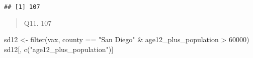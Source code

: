 \documentclass[
]{article}
\newenvironment{Shaded}{\begin{snugshade}}{\end{snugshade}}
\newcommand{\DecValTok}[1]{\textcolor[rgb]{0.00,0.00,0.81}{#1}}
\newcommand{\FunctionTok}[1]{\textcolor[rgb]{0.00,0.00,0.00}{#1}}
\newcommand{\NormalTok}[1]{#1}
\newcommand{\OtherTok}[1]{\textcolor[rgb]{0.56,0.35,0.01}{#1}}
\newcommand{\SpecialCharTok}[1]{\textcolor[rgb]{0.00,0.00,0.00}{#1}}
\newcommand{\StringTok}[1]{\textcolor[rgb]{0.31,0.60,0.02}{#1}}
\begin{document}
\begin{verbatim}
## [1] 107
\end{verbatim}

\begin{quote}
Q11. 107
\end{quote}

\begin{Shaded}
\begin{Highlighting}[]
\NormalTok{sd12 }\OtherTok{\textless{}{-}} \FunctionTok{filter}\NormalTok{(vax, county }\SpecialCharTok{==} \StringTok{"San Diego"} \SpecialCharTok{\&}\NormalTok{ age12\_plus\_population }\SpecialCharTok{\textgreater{}} \DecValTok{60000}\NormalTok{)}
\NormalTok{sd12[, }\FunctionTok{c}\NormalTok{(}\StringTok{"age12\_plus\_population"}\NormalTok{)]}
\end{Highlighting}
\end{Shaded}
\end{document}
